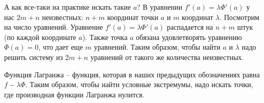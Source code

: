 \vspace*{5mm}

А как все-таки на практике искать такие $a$?
В уравнении $f'(a) = \lambda \Phi'(a)$ у нас $2m + n$ неизвестных: $n + m$ координат точки $a$ и $m$ координат $\lambda$.
Посмотрим на число уравнений. 
Уравнение $f'(a) = \lambda \Phi'(a)$ распадается на $n + m$ штук (по каждой координате $a$).
Также точка $a$ обязана удовлетворять уравнению $\Phi(a) = 0$, что дает еще $m$ уравнений.
Таким образом, чтобы найти $a$ и $\lambda$ надо решить систему из $2m + n$ уравнений от такого же количества неизвестных. 
 
\vspace*{5mm}

\begin{conj}
    Функция Лагранжа -- функция, которая в наших предыдущих обозначениях равна $f - \lambda \Phi$.
    Таким образом, чтобы найти условные экстремумы, надо искать точки, где производная функции Лагранжа нулится.
\end{conj}
